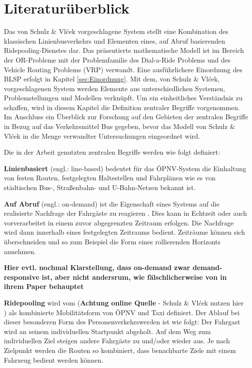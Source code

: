 
\chapter{Literaturüberblick}
\label{chapter:2}
Das von Schulz \& Vlćek vorgeschlagene System stellt eine Kombination des klassischen Linienbusverkehrs und Elementen eines, auf Abruf basierenden Ridepooling-Dienstes dar. Das präsentierte mathematische Modell ist im Bereich der OR-Probleme mit der Problemfamilie des Dial-a-Ride Problems und des Vehicle Routing Problems (VRP) verwandt. Eine ausführlichere Einordnung des BLSP erfolgt in Kapitel \ref{sec:Einordnung}. Mit dem, von Schulz \& Vlćek, vorgeschlagenen System werden Elemente aus unterschiedlichen Systemen, Problemstellungen und Modellen verknüpft. Um ein einheitliches Verständnis zu schaffen, wird in diesem Kapitel die Definition zentraler Begriffe vorgenommen. Im Anschluss ein Überblick zur Forschung auf den Gebieten der zentralen Begriffe in Bezug auf das Verkehrsmittel Bus gegeben, bevor das Modell von Schulz \& Vlćek in die Menge verwandter Untersuchungen eingeordnet wird. 

Die in der Arbeit genutzten zentralen Begriffe werden wie folgt definiert:

\textbf{Linienbasiert} (engl.: line-based) bedeutet für das ÖPNV-System die Einhaltung von festen Routen, festgelegten Haltestellen und Fahrplänen wie es von städtischen Bus-, Straßenbahn- und U-Bahn-Netzen bekannt ist.

\textbf{Auf Abruf} (engl.: on-demand) ist die Eigenschaft eines Systems auf die realisierte Nachfrage der Fahrgäste zu reagieren \parencite[vgl.][S.3]{vansteenwegen_survey_2022}. Dies kann in Echtzeit oder auch vorverarbeitet in einem zuvor abgegrenzten Zeitraum erfolgen. Die Nachfrage wird dann innerhalb eines festgelegten Zeitraums bedient. Zeiträume können sich überschneiden und so zum Beispiel die Form eines rollierenden Horizonts annehmen.

\textbf{Hier evtl. nochmal Klarstellung, dass on-demand zwar demand-responsive ist, aber nicht andersrum, wie fälschlicherweise von \textcite{wang_multilevel_2014} in ihrem Paper behauptet}

\textbf{Ridepooling} wird vom \textcite{verband_der_automobilindustrie_ridepooling_2025} (\textbf{Achtung online Quelle} - Schulz \& Vlćek nutzen hier \parencite{vansteenwegen_survey_2022}) als kombinierte Mobilitätsform von ÖPNV und Taxi definiert. Der Ablauf bei dieser besonderen Form des Personenverkehrswerden ist wie folgt: Der Fahrgast wird an seinem individuellen Startpunkt abgeholt. Auf dem Weg zum individuellen Ziel steigen andere Fahrgäste zu und/oder wieder aus. Je nach Zielpunkt werden die Routen so kombiniert, dass benachbarte Ziele mit einem Fahrzeug bedient werden können.   


